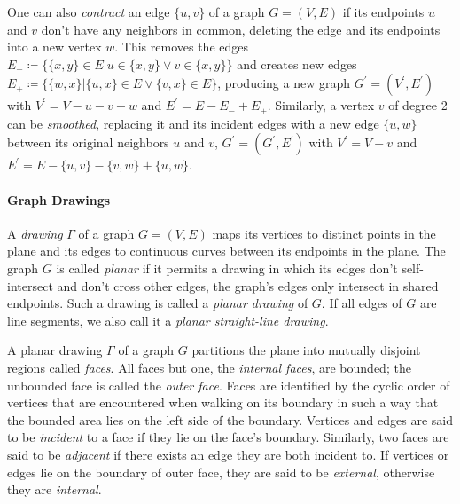 One can also \emph{contract} an edge $\{u,v\}$ of a graph $G = (V, E)$ if its endpoints $u$ and $v$ don't have any neighbors in common, deleting the edge and  its endpoints into a new vertex $w$.
This removes the edges $E_- \coloneqq \{ \{x,y\} \in E \vert u \in \{x,y\} \lor v \in \{x,y\} \}$ and creates new edges $E_+ \coloneqq \{ \{w,x\} \vert \{u,x\} \in E \lor \{v,x\} \in E \}$, producing a new graph $G^\prime = (V^\prime, E^\prime)$ with $V^\prime = V - u - v + w$ and $E^\prime = E - E_- + E_+$.
Similarly, a vertex $v$ of degree 2 can be \emph{smoothed}, replacing it and its incident edges with a new edge $\{u,w\}$ between its original neighbors $u$ and $v$, \ie{} $G^\prime = (G^\prime, E^\prime)$ with $V^\prime = V - v$ and $E^\prime = E - \{u,v\} - \{v,w\} + \{u,w\}$.



\paragraph{Graph Drawings}


A \emph{drawing} $\Gamma$ of a graph $G = (V, E)$ maps its vertices to distinct points in the plane and its edges to continuous curves between its endpoints in the plane.
The graph $G$ is called \emph{planar} if it permits a drawing in which its edges don't self-intersect and don't cross other edges, \ie{} the graph's edges only intersect in shared endpoints.
Such a drawing is called a \emph{planar drawing} of $G$.
If all edges of $G$ are line segments, we also call it a \emph{planar straight-line drawing}.

A planar drawing $\Gamma$ of a graph $G$ partitions the plane into mutually disjoint regions called \emph{faces}.
All faces but one, the \emph{internal faces}, are bounded; the unbounded face is called the \emph{outer face}.
Faces are identified by the cyclic order of vertices that are encountered when walking on its boundary \cite{angelini2015monotone} in such a way that the bounded area lies on the left side of the boundary.
Vertices and edges are said to be \emph{incident} to a face if they lie on the face's boundary.
Similarly, two faces are said to be \emph{adjacent} if there exists an edge they are both incident to.
If vertices or edges lie on the boundary of outer face, they are said to be \emph{external}, otherwise they are \emph{internal}.


